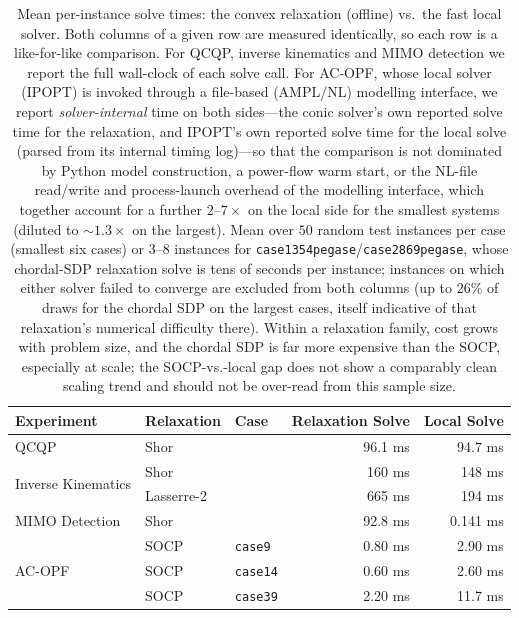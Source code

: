 \documentclass[10pt]{article} %
\theoremstyle{plain}
\theoremstyle{definition}
\theoremstyle{remark}
\begin{document}
\begin{table}[t]
\centering\footnotesize
\caption{Mean per-instance solve times: the convex relaxation (offline) vs.\ the fast
local solver. Both columns of a given row are measured identically, so each row is a
like-for-like comparison. For QCQP, inverse kinematics and MIMO detection we report the
full wall-clock of each solve call. For AC-OPF, whose local solver (IPOPT) is invoked
through a file-based (AMPL/NL) modelling interface, we report \emph{solver-internal} time
on both sides---the conic solver's own reported solve time for the relaxation, and
IPOPT's own reported solve time for the local solve (parsed from its internal timing
log)---so that the comparison is not dominated by Python model construction, a
power-flow warm start, or the NL-file read/write and process-launch overhead of the
modelling interface, which together account for a further $2$--$7\times$ on the local
side for the smallest systems (diluted to ${\sim}1.3\times$ on the largest). Mean over
$50$ random test instances per case (smallest six cases) or $3$--$8$ instances for
\texttt{case1354pegase}/\texttt{case2869pegase}, whose chordal-SDP relaxation solve is
tens of seconds per instance; instances on which either solver failed to converge are
excluded from both columns (up to $26\%$ of draws for the chordal SDP on the largest
cases, itself indicative of that relaxation's numerical difficulty there). Within a
relaxation family, cost grows with problem size, and the chordal SDP is far more
expensive than the SOCP, especially at scale; the SOCP-vs.-local gap does not show a
comparably clean scaling trend and should not be over-read from this sample size.}
\label{tab:timing}
\begin{tabular}{lll rr}
\toprule
\textbf{Experiment} & \textbf{Relaxation} & \textbf{Case} &
Relaxation Solve & Local Solve \\
\midrule
  \multirow{1}{*}{QCQP} & Shor &  & 96.1 ms & 94.7 ms \\
\midrule
  \multirow{2}{*}{Inverse Kinematics} & Shor &  & 160 ms & 148 ms \\
   & Lasserre-2 &  & 665 ms & 194 ms \\
\midrule
  \multirow{1}{*}{MIMO Detection} & Shor &  & 92.8 ms & 0.141 ms \\
\midrule
  \multirow{16}{*}{AC-OPF} & SOCP & \texttt{case9} & 0.80 ms & 2.90 ms \\
   & SOCP & \texttt{case14} & 0.60 ms & 2.60 ms \\
   & SOCP & \texttt{case39} & 2.20 ms & 11.7 ms \\

\end{tabular}
\end{table}
\end{document}
